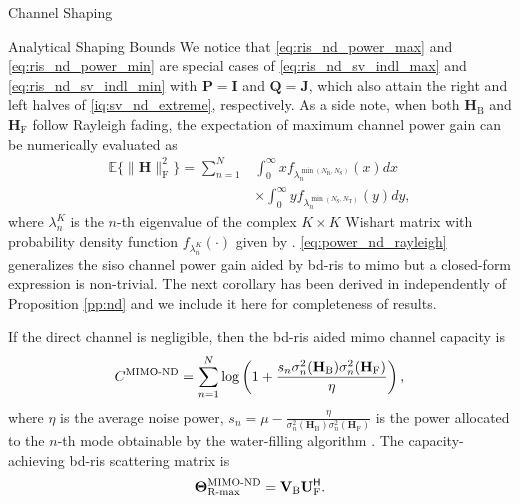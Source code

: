 \documentclass[journal]{IEEEtran}
\begin{document}
\begin{section}{Channel Shaping}
\begin{subsection}{Analytical Shaping Bounds}
		We notice that \eqref{eq:ris_nd_power_max} and \eqref{eq:ris_nd_power_min} are special cases of \eqref{eq:ris_nd_sv_indl_max} and \eqref{eq:ris_nd_sv_indl_min} with $\mathbf{P} = \mathbf{I}$ and $\mathbf{Q} = \mathbf{J}$, which also attain the right and left halves of \eqref{iq:sv_nd_extreme}, respectively.
		As a side note, when both $\mathbf{H}_\mathrm{B}$ and $\mathbf{H}_\mathrm{F}$ follow Rayleigh fading, the expectation of maximum channel power gain can be numerically evaluated as
		\begin{equation}
			\label{eq:power_nd_rayleigh}
			\begin{split}
				\mathbb{E}\bigl\{ \lVert \mathbf{H} \rVert _ \mathrm{F}^2 \bigr\} = \sum_{n=1}^N
				& \int_0^\infty x f_{\lambda_n^{\min(N_\mathrm{R},N_\mathrm{S})}}(x) d x         \\
				& \times \int_0^\infty y f_{\lambda_n^{\min(N_\mathrm{S},N_\mathrm{T})}}(y) d y,
			\end{split}
		\end{equation}
		where $\lambda_n^{K}$ is the $n$-th eigenvalue of the complex $K \times K$ Wishart matrix with probability density function $f_{\lambda_n^{K}}(\cdot)$ given by \cite[(51)]{Zanella2009}.
		\eqref{eq:power_nd_rayleigh} generalizes the \gls{siso} channel power gain aided by \gls{bd}-\gls{ris} \cite[(58)]{Shen2020a} to \gls{mimo} but a closed-form expression is non-trivial.
		The next corollary has been derived in \cite{Bartoli2023} independently of Proposition \ref{pp:nd} and we include it here for completeness of results.
		\begin{corollary}
			\label{co:nd_capacity_snr_general}
			If the direct channel is negligible, then the \gls{bd}-\gls{ris} aided \gls{mimo} channel capacity is
			\begin{equation}
				\label{eq:capacity_nd}
				C^\textnormal{MIMO-ND} = \sum_{n=1}^N \log \left(1 + \frac{s_n \sigma_n^2(\mathbf{H}_\mathrm{B}) \sigma_n^2(\mathbf{H}_\mathrm{F})}{\eta}\right),
			\end{equation}
			where $\eta$ is the average noise power, $s_n = \mu - \frac{\eta}{\sigma_n^2(\mathbf{H}_\mathrm{B}) \sigma_n^2(\mathbf{H}_\mathrm{F})}$ is the power allocated to the $n$-th mode obtainable by the water-filling algorithm \cite{Clerckx2013}.
			The capacity-achieving \gls{bd}-\gls{ris} scattering matrix is
			\begin{equation}
				\label{eq:ris_nd_rate_max}
				\mathbf{\Theta}_\textnormal{R-max}^\textnormal{MIMO-ND} = \mathbf{V}_\mathrm{B} \mathbf{U}_\mathrm{F}^\mathsf{H}.
			\end{equation}
		\end{corollary}


\end{subsection}
\end{section}
\end{document}
